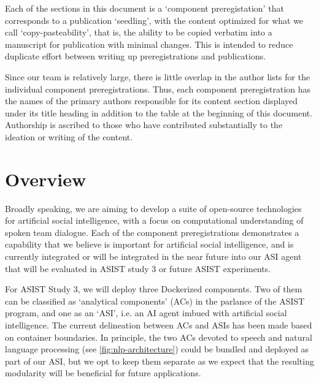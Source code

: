 Each of the sections in this document is a `component preregistation' that
corresponds to a publication `seedling', with the content optimized for what we
call `copy-pasteability', that is, the ability to be copied verbatim into a
manuscript for publication with minimal changes. This is intended to reduce
duplicate effort between writing up preregistrations and publications.

Since our team is relatively large, there is little overlap in the author lists
for the individual component preregistrations. Thus, each component
preregistration has the names of the primary authors responsible for its
content section displayed under its title heading in addition to the table at
the beginning of this document. Authorship is ascribed to those who have
contributed substantially to the ideation or writing of the content.

\section{Overview}

Broadly speaking, we are aiming to develop a suite of open-source technologies
for artificial social intelligence, with a focus on computational understanding
of spoken team dialogue. Each of the component preregistrations demonstrates a
capability that we believe is important for artificial social intelligence, and
is currently integrated or will be integrated in the near future into our ASI
agent that will be evaluated in ASIST study 3 or future ASIST experiments.

For ASIST Study 3, we will deploy three Dockerized components. Two of them can
be classified as `analytical components' (ACs) in the parlance of the ASIST
program, and one as an `ASI', i.e. an AI agent imbued with artificial social
intelligence. The current delineation between ACs and ASIs has been made based
on container boundaries. In principle, the two ACs devoted to speech and
natural language processing (see \autoref{fig:nlp-architecture}) could be
bundled and deployed as part of our ASI, but we opt to keep them separate as we
expect that the resulting modularity will be beneficial for future
applications.

